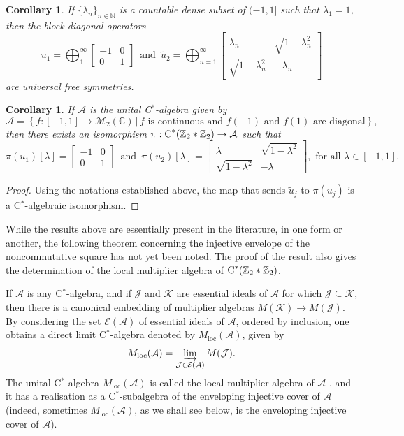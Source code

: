 \documentclass{amsart}
\newtheorem{corollary}[theorem]{Corollary}
\theoremstyle{definition}
\theoremstyle{remark}
\newcommand{\K}{\mathcal K}
\newcommand{\M}{\mathcal{M}}
\newcommand{\A}{\mathcal{A}}                    %
\newcommand{\jay}{\mathcal{J}}                   %
\newcommand{\kay}{\mathcal{K}}                 %
\newcommand\cstar{{\textrm C}^*}                              %
\numberwithin{equation}{section}
\begin{document}
\begin{corollary}\label{bd} If $\{\lambda_n\}_{n\in\mathbb N}$ is a countable dense subset of $(-1,1]$ such that $\lambda_1=1$, then the block-diagonal operators
	\[
	\tilde u_1=\bigoplus_1^\infty \left[ \begin{array}{cc}-1 &0 \\ 0 & 1\end{array}\right] \,\mbox{ and }\,
	\tilde u_2 =\bigoplus_{n=1}^\infty \left[ \begin{array}{cc}\lambda_n &\sqrt{1-\lambda_n^2} \\ \sqrt{1-\lambda_n^2} & -\lambda_n\end{array}\right]
	\]
	are universal free symmetries.
\end{corollary}

\begin{corollary}\label{d=2} If $\A$ is the unital C$^*$-algebra given by
	\[
	\A=\left\{ f:[-1,1]\rightarrow\M_2(\mathbb C)\,|\,f\mbox{ is continuous and }f(-1) \mbox{ and }f(1)\mbox{ are diagonal}\right\},
	\]
	then there exists an isomorphism $\pi:\cstar(\mathbb Z_2 * \mathbb Z_2)\rightarrow\A$ such that
	\[
	\pi(u_1)[\lambda]=\left[\begin{array}{cc} -1 & 0 \\ 0 & 1 \end{array} \right] \,\mbox{ and }\,
	\pi(u_2)[\lambda]=\left[\begin{array}{cc} \lambda & \sqrt{1-\lambda^2} \\ \sqrt{1-\lambda^2} & -\lambda \end{array} \right],
	\mbox{ for all }\lambda\in[-1,1].
	\]
\end{corollary}

\begin{proof} Using the notations established above,   
	the map that sends $\tilde u_j$ to $\pi(u_j)$ is a C$^*$-algebraic isomorphism.
\end{proof}

While the results above are essentially present in the literature, in one form or another, the following theorem concerning the injective envelope 
of the noncommutative square has not yet been noted. The proof of the result
also gives the determination of the local multiplier algebra of $\cstar(\mathbb Z_2 * \mathbb Z_2)$.

If $\A$ is any C$^*$-algebra, and if $\jay$ and $\K$ are essential ideals of $\A$ for which $\jay\subseteq\kay$, then there is a canonical embedding
of multiplier algebras $M(\kay)\rightarrow M(\jay)$. By considering the set $\mathcal E(\A)$ of essential ideals of $\A$, ordered by inclusion, one obtains a
direct limit C$^*$-algebra denoted by $M_{\textrm{loc}}(\A)$, given by 
\[
M_{\textrm{loc}}(\A) = \varinjlim_{\jay\in\mathcal E(\A)}M(\jay).
\]
The unital C$^*$-algebra $M_{\textrm{loc}}(\A)$ is called the local multiplier algebra of $\A$ \cite{pedersen1978}, 
and it has a realisation as a C$^*$-subalgebra of the enveloping injective
cover of $\A$ (indeed, sometimes $M_{\textrm{loc}}(\A)$, as we shall see below, is the enveloping injective cover of $\A$).
\end{document}
